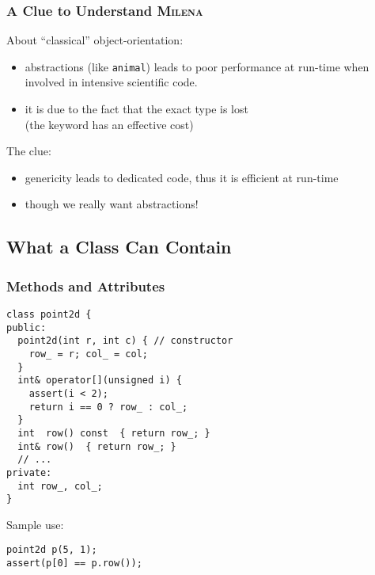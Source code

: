 \documentclass{beamer}
\newcommand{\kw}[1]{{\color{blue}{\texttt{#1}}}\xspace}
\newcommand{\code}[1]{{\scriptsize{\texttt{#1}}}\xspace}
\newcommand{\mln}{\textsc{Milena}\xspace}
\begin{document}
\begin{frame}
  \frametitle{A Clue to Understand \mln}

  About ``classical'' object-orientation:

  \begin{itemize}
  \item abstractions (like \code{animal}) leads to poor
    performance at run-time when involved in intensive scientific code.
  \item it is due to the fact that the exact type is lost\\
    (the \kw{virtual} keyword has an effective cost)
  \end{itemize}
  
  \smallskip

  The clue:

  \begin{itemize}
  \item genericity leads to dedicated code, thus it is efficient at run-time
  \item though we really want abstractions!
  \end{itemize}
  

\end{frame}



\subsection{What a Class Can Contain}



\begin{frame}[fragile]
  \frametitle{Methods and Attributes}

\begin{lstlisting}
class point2d {
public:
  point2d(int r, int c) { // constructor
    row_ = r; col_ = col;
  }
  int& operator[](unsigned i) {
    assert(i < 2);
    return i == 0 ? row_ : col_;
  }
  int  row() const  { return row_; }
  int& row()  { return row_; }
  // ...
private:
  int row_, col_;
}
\end{lstlisting}

Sample use:
\begin{lstlisting}
point2d p(5, 1);
assert(p[0] == p.row());
\end{lstlisting}

\end{frame}
\end{document}
